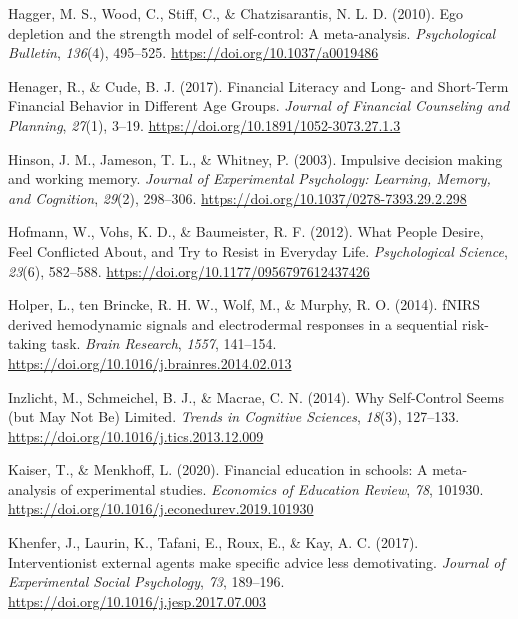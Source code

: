 \documentclass[
  letterpaper,
  DIV=11,
  numbers=noendperiod]{scrartcl}
\newlength{\cslhangindent}
\newlength{\cslentryspacingunit} %
\newenvironment{CSLReferences}[2] %
 {%
  \setlength{\parindent}{0pt}
  \ifodd #1
  \let\oldpar\par
  \def\par{\hangindent=\cslhangindent\oldpar}
  \fi
  \setlength{\parskip}{#2\cslentryspacingunit}
 }%
 {}
\begin{document}
\begin{CSLReferences}{1}{0}
\leavevmode{}%
Hagger, M. S., Wood, C., Stiff, C., \& Chatzisarantis, N. L. D. (2010).
Ego depletion and the strength model of self-control: {A} meta-analysis.
\emph{Psychological Bulletin}, \emph{136}(4), 495--525.
\url{https://doi.org/10.1037/a0019486}

\leavevmode{}%
Henager, R., \& Cude, B. J. (2017). Financial {Literacy} and {Long-} and
{Short-Term Financial Behavior} in {Different Age Groups}. \emph{Journal
of Financial Counseling and Planning}, \emph{27}(1), 3--19.
\url{https://doi.org/10.1891/1052-3073.27.1.3}

\leavevmode{}%
Hinson, J. M., Jameson, T. L., \& Whitney, P. (2003). Impulsive decision
making and working memory. \emph{Journal of Experimental Psychology:
Learning, Memory, and Cognition}, \emph{29}(2), 298--306.
\url{https://doi.org/10.1037/0278-7393.29.2.298}

\leavevmode{}%
Hofmann, W., Vohs, K. D., \& Baumeister, R. F. (2012). What {People
Desire}, {Feel Conflicted About}, and {Try} to {Resist} in {Everyday
Life}. \emph{Psychological Science}, \emph{23}(6), 582--588.
\url{https://doi.org/10.1177/0956797612437426}

\leavevmode{}%
Holper, L., ten Brincke, R. H. W., Wolf, M., \& Murphy, R. O. (2014).
{fNIRS} derived hemodynamic signals and electrodermal responses in a
sequential risk-taking task. \emph{Brain Research}, \emph{1557},
141--154. \url{https://doi.org/10.1016/j.brainres.2014.02.013}

\leavevmode{}%
Inzlicht, M., Schmeichel, B. J., \& Macrae, C. N. (2014). Why
{Self-Control Seems} (but {May Not Be}) {Limited}. \emph{Trends in
Cognitive Sciences}, \emph{18}(3), 127--133.
\url{https://doi.org/10.1016/j.tics.2013.12.009}

\leavevmode{}%
Kaiser, T., \& Menkhoff, L. (2020). Financial education in schools: {A}
meta-analysis of experimental studies. \emph{Economics of Education
Review}, \emph{78}, 101930.
\url{https://doi.org/10.1016/j.econedurev.2019.101930}

\leavevmode{}%
Khenfer, J., Laurin, K., Tafani, E., Roux, E., \& Kay, A. C. (2017).
Interventionist external agents make specific advice less demotivating.
\emph{Journal of Experimental Social Psychology}, \emph{73}, 189--196.
\url{https://doi.org/10.1016/j.jesp.2017.07.003}


\end{CSLReferences}
\end{document}

